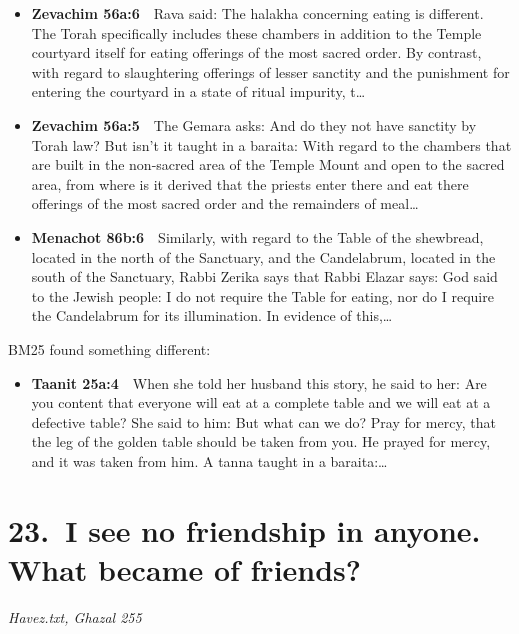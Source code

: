 \documentclass[11pt,a4paper]{article}
\begin{document}
\begin{itemize}[leftmargin=1.2em,itemsep=3pt]
\item {\color{ref}\textbf{Zevachim 56a:6}}\ \ Rava said: The halakha concerning eating is different. The Torah specifically includes these chambers in addition to the Temple courtyard itself for eating offerings of the most sacred order. By contrast, with regard to slaughtering offerings of lesser sanctity and the punishment for entering the courtyard in a state of ritual impurity, t\ldots
\item {\color{ref}\textbf{Zevachim 56a:5}}\ \ The Gemara asks: And do they not have sanctity by Torah law? But isn’t it taught in a baraita: With regard to the chambers that are built in the non-sacred area of the Temple Mount and open to the sacred area, from where is it derived that the priests enter there and eat there offerings of the most sacred order and the remainders of meal\ldots
\item {\color{ref}\textbf{Menachot 86b:6}}\ \ Similarly, with regard to the Table of the shewbread, located in the north of the Sanctuary, and the Candelabrum, located in the south of the Sanctuary, Rabbi Zerika says that Rabbi Elazar says: God said to the Jewish people: I do not require the Table for eating, nor do I require the Candelabrum for its illumination. In evidence of this,\ldots
\end{itemize}
{\color{quiet}\small BM25 found something different:}
\begin{itemize}[leftmargin=1.2em]
\item {\color{ref}\textbf{Taanit 25a:4}}\ \ When she told her husband this story, he said to her: Are you content that everyone will eat at a complete table and we will eat at a defective table? She said to him: But what can we do? Pray for mercy, that the leg of the golden table should be taken from you. He prayed for mercy, and it was taken from him. A tanna taught in a baraita:\ldots
\end{itemize}

\section*{23.\ I see no friendship in anyone. What became of friends?}
{\color{quiet}\small\textit{Havez.txt, Ghazal 255}}
\end{document}
